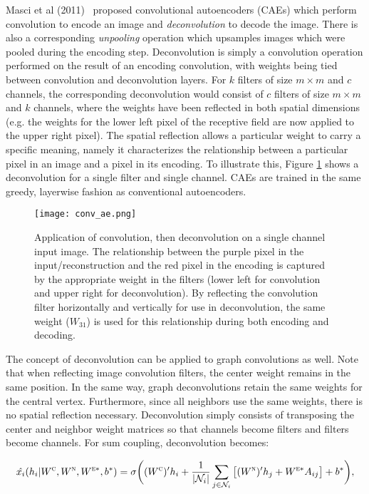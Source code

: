 Masci et al (2011)~\cite{masci2011} proposed convolutional autoencoders (CAEs) which perform convolution to encode an image and \emph{deconvolution} to decode the image.
There is also a corresponding \emph{unpooling} operation which upsamples images which were pooled during the encoding step.
Deconvolution is simply a convolution operation performed on the result of an encoding convolution, with weights being tied between convolution and deconvolution layers.
For $k$ filters of size $m \times m$ and $c$ channels, the corresponding deconvolution would consist of $c$ filters of size $m \times m$ and $k$ channels, where the weights have been reflected in both spatial dimensions (e.g. the weights for the lower left pixel of the receptive field are now applied to the upper right pixel).
The spatial reflection allows a particular weight to carry a specific meaning, namely it characterizes the relationship between a particular pixel in an image and a pixel in its encoding.
To illustrate this, Figure \ref{fig:deconv} shows a deconvolution for a single filter and single channel.
CAEs are trained in the same greedy, layerwise fashion as conventional autoencoders.

\begin{figure}
	\texttt{[image: conv\_ae.png]}
	\caption{Application of convolution, then deconvolution on a single channel input image. The relationship between the purple pixel in the input/reconstruction and the red pixel in the encoding is captured by the appropriate weight in the filters (lower left for convolution and upper right for deconvolution). By reflecting the convolution filter horizontally and vertically for use in deconvolution, the same weight ($W_{31}$) is used for this relationship during both encoding and decoding.
		\label{fig:deconv}}
\end{figure}


The concept of deconvolution can be applied to graph convolutions as well.
Note that when reflecting image convolution filters, the center weight remains in the same position.
In the same way, graph deconvolutions retain the same weights for the central vertex. 
Furthermore, since all neighbors use the same weights, there is no spatial reflection necessary.
Deconvolution simply consists of transposing the center and neighbor weight matrices so that channels become filters and filters become channels.
For sum coupling, deconvolution becomes:

\begin{equation}
\hat{x_i}(h_i | W^\textsc{c}, W^\textsc{n}, W^{\textsc{e}*}, b^*) = \sigma \bigg( (W^{\textsc{c}})' h_i + \frac{1}{|\mathcal{N}_i|}\sum_{j \in \mathcal{N}_i} \big[ (W^{\textsc{n}})' h_j + W^{\textsc{e}*} A_{ij} \big] + b^* \bigg),
\label{eq:sum_deconv}
\end{equation}


